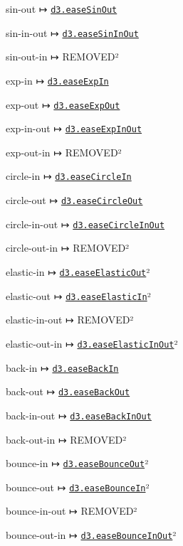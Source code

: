 \begin{DoxyItemize}
\item sin-\/out ↦ \href{https://github.com/d3/d3-ease/blob/master/README.md#easeSinOut}{\tt d3.\+ease\+Sin\+Out}
\item sin-\/in-\/out ↦ \href{https://github.com/d3/d3-ease/blob/master/README.md#easeSinInOut}{\tt d3.\+ease\+Sin\+In\+Out}
\item sin-\/out-\/in ↦ R\+E\+M\+O\+V\+E\+D²
\item exp-\/in ↦ \href{https://github.com/d3/d3-ease/blob/master/README.md#easeExpIn}{\tt d3.\+ease\+Exp\+In}
\item exp-\/out ↦ \href{https://github.com/d3/d3-ease/blob/master/README.md#easeExpOut}{\tt d3.\+ease\+Exp\+Out}
\item exp-\/in-\/out ↦ \href{https://github.com/d3/d3-ease/blob/master/README.md#easeExpInOut}{\tt d3.\+ease\+Exp\+In\+Out}
\item exp-\/out-\/in ↦ R\+E\+M\+O\+V\+E\+D²
\item circle-\/in ↦ \href{https://github.com/d3/d3-ease/blob/master/README.md#easeCircleIn}{\tt d3.\+ease\+Circle\+In}
\item circle-\/out ↦ \href{https://github.com/d3/d3-ease/blob/master/README.md#easeCircleOut}{\tt d3.\+ease\+Circle\+Out}
\item circle-\/in-\/out ↦ \href{https://github.com/d3/d3-ease/blob/master/README.md#easeCircleInOut}{\tt d3.\+ease\+Circle\+In\+Out}
\item circle-\/out-\/in ↦ R\+E\+M\+O\+V\+E\+D²
\item elastic-\/in ↦ \href{https://github.com/d3/d3-ease/blob/master/README.md#easeElasticOut}{\tt d3.\+ease\+Elastic\+Out}²
\item elastic-\/out ↦ \href{https://github.com/d3/d3-ease/blob/master/README.md#easeElasticIn}{\tt d3.\+ease\+Elastic\+In}²
\item elastic-\/in-\/out ↦ R\+E\+M\+O\+V\+E\+D²
\item elastic-\/out-\/in ↦ \href{https://github.com/d3/d3-ease/blob/master/README.md#easeElasticInOut}{\tt d3.\+ease\+Elastic\+In\+Out}²
\item back-\/in ↦ \href{https://github.com/d3/d3-ease/blob/master/README.md#easeBackIn}{\tt d3.\+ease\+Back\+In}
\item back-\/out ↦ \href{https://github.com/d3/d3-ease/blob/master/README.md#easeBackOut}{\tt d3.\+ease\+Back\+Out}
\item back-\/in-\/out ↦ \href{https://github.com/d3/d3-ease/blob/master/README.md#easeBackInOut}{\tt d3.\+ease\+Back\+In\+Out}
\item back-\/out-\/in ↦ R\+E\+M\+O\+V\+E\+D²
\item bounce-\/in ↦ \href{https://github.com/d3/d3-ease/blob/master/README.md#easeBounceOut}{\tt d3.\+ease\+Bounce\+Out}²
\item bounce-\/out ↦ \href{https://github.com/d3/d3-ease/blob/master/README.md#easeBounceIn}{\tt d3.\+ease\+Bounce\+In}²
\item bounce-\/in-\/out ↦ R\+E\+M\+O\+V\+E\+D²
\item bounce-\/out-\/in ↦ \href{https://github.com/d3/d3-ease/blob/master/README.md#easeBounceInOut}{\tt d3.\+ease\+Bounce\+In\+Out}²
\end{DoxyItemize}

